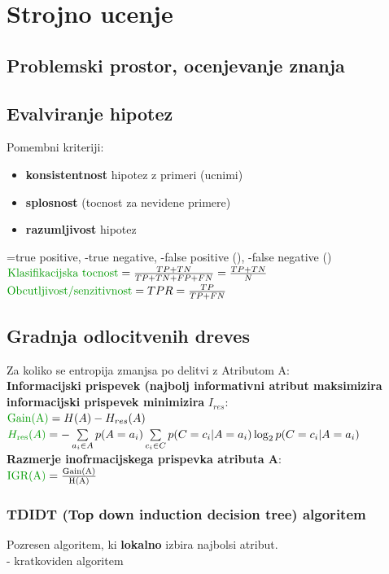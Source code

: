\section{Strojno ucenje}


\subsection{Problemski prostor, ocenjevanje znanja}

\subsection{Evalviranje hipotez}
Pomembni kriteriji:
\begin{itemize}[leftmargin=*,labelindent=0pt,labelwidth=0pt,itemsep=0pt,parsep=0pt,topsep=0pt]
    \item \textbf{konsistentnost} hipotez z primeri (ucnimi)
    \item \textbf{splosnost} (tocnost za nevidene primere)
    \item \textbf{razumljivost} hipotez
\end{itemize}
=true positive, -true negative, -false positive (), -false negative () \\
$\text{\green{Klasifikacijska tocnost}}=\frac{TP+TN}{TP+TN+FP+FN}=\frac{TP+TN}{N}$\\
$\text{\green{Obcutljivost/senzitivnost}}=TPR=\frac{TP}{TP+FN}$

\subsection{Gradnja odlocitvenih dreves}
Za koliko se entropija zmanjsa po delitvi z Atributom A:\\
\textbf{Informacijski prispevek (najbolj informativni atribut maksimizira informacijski prispevek minimizira} $I_{res}$:\\
$\text{\green{Gain(A)}}=H(A)-H_{res}(A)$\\
$\green{H_{\text{res}}(A)}=-\sum\limits_{a_i\in A}p(A=a_i)\sum\limits_{c_i\in C} p(C=c_i|A=a_i)\log_2p(C=c_i|A=a_i)$\\
\textbf{Razmerje inofrmacijskega prispevka atributa A}:\\ 
$\text{\green{IGR(A)}}=\frac{\text{Gain(A)}}{\text{H(A)}}$


\subsubsection{TDIDT (Top down induction decision tree) algoritem}
Pozresen algoritem, ki \textbf{lokalno} izbira najbolsi atribut.\\
- kratkoviden algoritem

